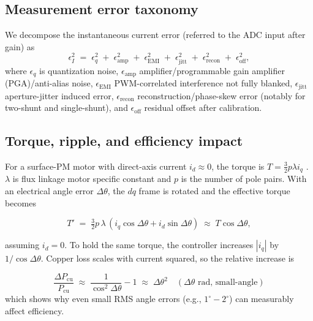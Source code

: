 \documentclass[conference]{IEEEtran}
\begin{document}
\subsection{Measurement error taxonomy}
We decompose the instantaneous current error (referred to the ADC input after gain) as
\begin{equation}
\epsilon_I^2 \;=\; \epsilon_q^2 \;+\; \epsilon_{\text{amp}}^2 \;+\; \epsilon_{\text{EMI}}^2 \;+\; \epsilon_{\text{jitt}}^2 \;+\; \epsilon_{\text{recon}}^2 \;+\; \epsilon_{\text{off}}^2 ,
\label{eq:errbudget}
\end{equation}
where \(\epsilon_q\) is quantization noise, \(\epsilon_{\text{amp}}\) amplifier/programmable gain amplifier (PGA)/anti-alias noise, \(\epsilon_{\text{EMI}}\) PWM-correlated interference not fully blanked, \(\epsilon_{\text{jitt}}\) aperture-jitter induced error, \(\epsilon_{\text{recon}}\) reconstruction/phase-skew error (notably for two-shunt and single-shunt), and \(\epsilon_{\text{off}}\) residual offset after calibration.

\subsection{Torque, ripple, and efficiency impact}
For a surface-PM motor with direct-axis current \(i_d\!\approx\!0\), the torque is \(T = \tfrac{3}{2} p \lambda i_q\) \cite{Krause2013}. $\lambda$ is flux linkage motor specific constant and $p$ is the number of pole pairs. With an electrical angle error \(\Delta\theta\), the \(dq\) frame is rotated and the effective torque becomes

\begin{equation}
T' \;=\; \tfrac{3}{2}p\,\lambda\,(i_q \cos\Delta\theta + i_d \sin\Delta\theta) \;\approx\; T \cos\Delta\theta ,
\label{eq:torque_error}
\end{equation}

assuming \(i_d\!=\!0\). To hold the same torque, the controller increases \(|i_q|\) by \(1/\cos\Delta\theta\). Copper loss scales with current squared, so the relative increase is

\begin{equation}
\frac{\Delta P_{\mathrm{cu}}}{P_{\mathrm{cu}}} \;\approx\; \frac{1}{\cos^2\Delta\theta}-1 \;\approx\; \Delta\theta^2 \quad (\Delta\theta 
\text{ rad, small-angle})
\label{eq:cu-loss}
\end{equation}
which shows why even small RMS angle errors (e.g., \(1^\circ\!-\!2^\circ\)) can measurably affect efficiency.
\end{document}
